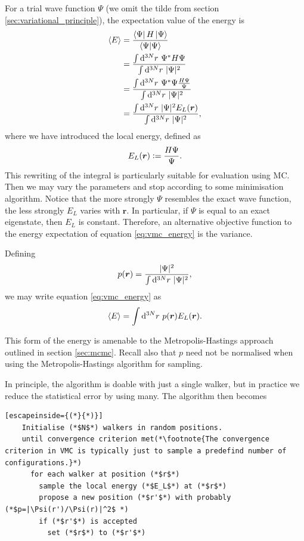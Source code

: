 For a trial wave function $\Psi$ (we omit the tilde from section \ref{sec:variational_principle}), the expectation value of the energy is
\begin{align}
    \label{eq:vmc_energy}
    \langle E \rangle &= \frac{\bra{\Psi}H\ket{\Psi}}{\bra{\Psi}\ket{\Psi}} \\
    \label{eq:vmc_step1}
    &= \frac{\int\d^{3N}r\ \Psi^*H\Psi}{\int\d^{3N}r\ |\Psi|^2} \\
    \label{eq:vmc_step2}
    &= \frac{\int\d^{3N}r\ \Psi^*\Psi \frac{H\Psi}{\Psi}}{\int\d^{3N}r\ |\Psi|^2} \\
    \label{eq:vmc_step3}
    &= \frac{\int\d^{3N}r\ |\Psi|^2 E_L(\bm r)}{\int\d^{3N}r\ |\Psi|^2},
\end{align}
where we have introduced the local energy, defined as
\begin{equation}
    E_L(\bm r) \mathrel{\mathop:}= \frac{H\Psi}{\Psi}.
\end{equation}
This rewriting of the integral is particularly suitable for evaluation using \gls{MC}. Then we may vary the parameters and stop according to some minimisation algorithm.
Notice that the more strongly $\Psi$ resembles the exact wave function, the less strongly $E_L$ varies with $\bm r$. In particular, if $\Psi$ is equal to an exact eigenstate, then $E_L$ is constant. Therefore, an alternative objective function to the energy expectation of equation \ref{eq:vmc_energy} is the variance.\supercite{cuzzocreaVariational2020,snajdrAre2000,kentMonte1999}

Defining
\begin{equation}
    p(\bm r) = \frac{|\Psi|^2}{\int\mathrm{d}^{3N}r\ |\Psi|^2},
\end{equation}
we may write equation \ref{eq:vmc_energy} as
\begin{equation}
    \langle E\rangle = \int\mathrm{d}^{3N}r\ p(\bm r)E_L(\bm r).
\end{equation}

This form of the energy is amenable to the Metropolis-Hastings approach outlined in section \ref{sec:mcmc}. Recall also that $p$ need not be normalised when using the Metropolis-Hastings algorithm for sampling.

In principle, the algorithm is doable with just a single walker, but in practice we reduce the statistical error by using many. The algorithm then becomes

\begin{lstlisting}[escapeinside={(*}{*)}]
    Initialise (*$N$*) walkers in random positions.
    until convergence criterion met(*\footnote{The convergence criterion in VMC is typically just to sample a predefind number of configurations.}*)
      for each walker at position (*$r$*)
        sample the local energy (*$E_L$*) at (*$r$*)
        propose a new position (*$r'$*) with probably (*$p=|\Psi(r')/\Psi(r)|^2$ *)
        if (*$r'$*) is accepted
          set (*$r$*) to (*$r'$*)
\end{lstlisting}

